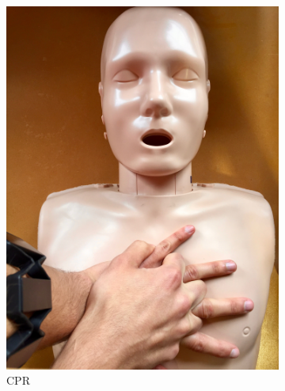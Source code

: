 \begin{figure}[b]
	\centering
	\begin{subfigure}[b]{0.18\textwidth}
		\includegraphics[width=\textwidth]{pictures/cpr}
		\caption{CPR}
		\label{fig:cpr}
	\end{subfigure}
	~ %
	\begin{subfigure}[b]{0.18\textwidth}

\end{subfigure}
\end{figure}

